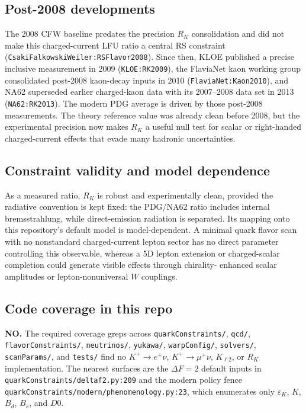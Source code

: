 \subsection*{Post-2008 developments}
The 2008 CFW baseline predates the precision \(R_K\) consolidation and did
not make this charged-current LFU ratio a central RS constraint
(\texttt{CsakiFalkowskiWeiler:RSFlavor2008}).  Since then, KLOE published a
precise inclusive measurement in 2009 (\texttt{KLOE:RK2009}), the FlaviaNet
kaon working group consolidated post-2008 kaon-decay inputs in 2010
(\texttt{FlaviaNet:Kaon2010}), and NA62 superseded earlier charged-kaon data
with its 2007--2008 data set in 2013 (\texttt{NA62:RK2013}).  The modern PDG
average is driven by those post-2008 measurements.  The theory reference value
was already clean before 2008, but the experimental precision now makes
\(R_K\) a useful null test for scalar or right-handed charged-current effects
that evade many hadronic uncertainties.

\subsection*{Constraint validity and model dependence}
As a measured ratio, \(R_K\) is robust and experimentally clean, provided the
radiative convention is kept fixed: the PDG/NA62 ratio includes internal
bremsstrahlung, while direct-emission radiation is separated.  Its mapping
onto this repository's default model is model-dependent.  A minimal quark
flavor scan with no nonstandard charged-current lepton sector has no direct
parameter controlling this observable, whereas a 5D lepton extension or
charged-scalar completion could generate visible effects through chirality-
enhanced scalar amplitudes or lepton-nonuniversal \(W\) couplings.

\subsection*{Code coverage in this repo}
\textbf{NO.}  The required coverage greps across \texttt{quarkConstraints/},
\texttt{qcd/}, \texttt{flavorConstraints/}, \texttt{neutrinos/},
\texttt{yukawa/}, \texttt{warpConfig/}, \texttt{solvers/},
\texttt{scanParams/}, and \texttt{tests/} find no \(K^+\to e^+\nu\),
\(K^+\to\mu^+\nu\), \(K_{\ell2}\), or \(R_K\) implementation.  The nearest
surfaces are the \(\Delta F=2\) default inputs in
\texttt{quarkConstraints/deltaf2.py:209} and the modern policy fence
\texttt{quarkConstraints/modern/phenomenology.py:23}, which enumerates only
\(\varepsilon_K\), \(K\), \(B_d\), \(B_s\), and \(D0\).

